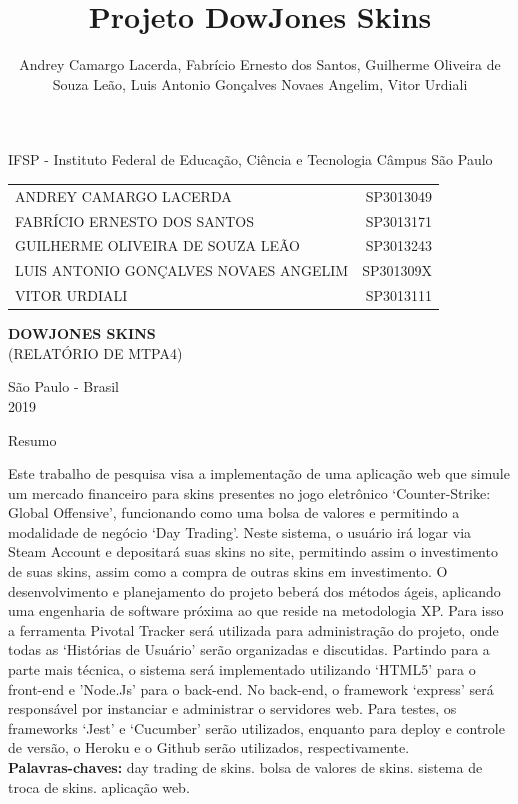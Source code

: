 \documentclass[a4paper, 12pt]{article}
\title{Projeto DowJones Skins}
\author{Andrey Camargo Lacerda, Fabrício Ernesto dos Santos, Guilherme Oliveira de Souza Leão, Luis Antonio Gonçalves Novaes Angelim, Vitor Urdiali}
\begin{document}
    \setlength{\parindent}{1.25cm}

    \thispagestyle{empty}
    \begin{center}
        \Large IFSP - Instituto Federal de Educação, Ciência e Tecnologia Câmpus São Paulo

        \vspace*{1.5 cm}

        \begin{tabular}{lr}
            \small ANDREY CAMARGO LACERDA & \small SP3013049 \\
            \small FABRÍCIO ERNESTO DOS SANTOS & \small SP3013171 \\
            \small GUILHERME OLIVEIRA DE SOUZA LEÃO & \small SP3013243 \\
            \small LUIS ANTONIO GONÇALVES NOVAES ANGELIM & \small SP301309X \\
            \small VITOR URDIALI & \small SP3013111 \\
        \end{tabular}

        \vspace*{5 cm}

        {\Large \bf DOWJONES SKINS} \\
        {\small (RELATÓRIO DE MTPA4)}

        \vspace*{6.1 cm}

        {\Large São Paulo - Brasil \\
        2019}
    \newpage %
    \begin{center}\Large Resumo \end{center}
    \end{center}
    \thispagestyle{empty}
    \begin{flushleft}
    Este trabalho de pesquisa visa a implementação de uma aplicação web que simule um mercado financeiro para skins presentes no jogo eletrônico ‘Counter-Strike: Global Offensive’, funcionando como uma bolsa de valores e permitindo a modalidade de negócio ‘Day Trading’. Neste sistema, o usuário irá logar via Steam Account e depositará suas skins no site, permitindo assim o investimento de suas skins, assim como a compra de outras skins em investimento. O desenvolvimento e planejamento do projeto beberá dos métodos ágeis, aplicando uma engenharia de software próxima ao que reside na metodologia XP. Para isso a ferramenta Pivotal Tracker será utilizada para administração do projeto, onde todas as ‘Histórias de Usuário’ serão organizadas e discutidas. Partindo para a parte mais técnica, o sistema será implementado utilizando ‘HTML5’ para o front-end e ’Node.Js’ para o back-end. No back-end, o framework ‘express’ será responsável por instanciar e administrar o servidores web. Para testes, os frameworks ‘Jest’ e ‘Cucumber’ serão utilizados, enquanto para deploy e controle de versão, o Heroku e o Github serão utilizados, respectivamente. \\
    
    \textbf{Palavras-chaves: } day trading de skins. bolsa de valores de skins. sistema de troca de skins. aplicação web.
    \end{flushleft}
\end{document}
